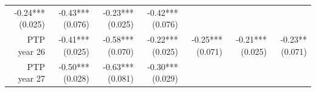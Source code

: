 \documentclass[]{article}
\begin{document}
\begin{longtable}[c]{@{}rrrrrrr@{}}
\begin{minipage}[t]{0.11\columnwidth}
-0.24*** (0.025)
\strut\end{minipage} &
\begin{minipage}[t]{0.12\columnwidth}\raggedleft\strut
-0.43*** (0.076)
\strut\end{minipage} &
\begin{minipage}[t]{0.11\columnwidth}\raggedleft\strut
-0.23*** (0.025)
\strut\end{minipage} &
\begin{minipage}[t]{0.11\columnwidth}\raggedleft\strut
-0.42*** (0.076)
\strut\end{minipage}\tabularnewline
\begin{minipage}[t]{0.12\columnwidth}\raggedleft\strut
PTP year 26
\strut\end{minipage} &
\begin{minipage}[t]{0.11\columnwidth}\raggedleft\strut
-0.41*** (0.025)
\strut\end{minipage} &
\begin{minipage}[t]{0.12\columnwidth}\raggedleft\strut
-0.58*** (0.070)
\strut\end{minipage} &
\begin{minipage}[t]{0.11\columnwidth}\raggedleft\strut
-0.22*** (0.025)
\strut\end{minipage} &
\begin{minipage}[t]{0.12\columnwidth}\raggedleft\strut
-0.25*** (0.071)
\strut\end{minipage} &
\begin{minipage}[t]{0.11\columnwidth}\raggedleft\strut
-0.21*** (0.025)
\strut\end{minipage} &
\begin{minipage}[t]{0.11\columnwidth}\raggedleft\strut
-0.23** (0.071)
\strut\end{minipage}\tabularnewline
\begin{minipage}[t]{0.12\columnwidth}\raggedleft\strut
PTP year 27
\strut\end{minipage} &
\begin{minipage}[t]{0.11\columnwidth}\raggedleft\strut
-0.50*** (0.028)
\strut\end{minipage} &
\begin{minipage}[t]{0.12\columnwidth}\raggedleft\strut
-0.63*** (0.081)
\strut\end{minipage} &
\begin{minipage}[t]{0.11\columnwidth}\raggedleft\strut
-0.30*** (0.029)
\strut\end{minipage} &
\begin{minipage}[t]{0.12\columnwidth}\raggedleft\strut

\end{minipage}
\end{longtable}
\end{document}
